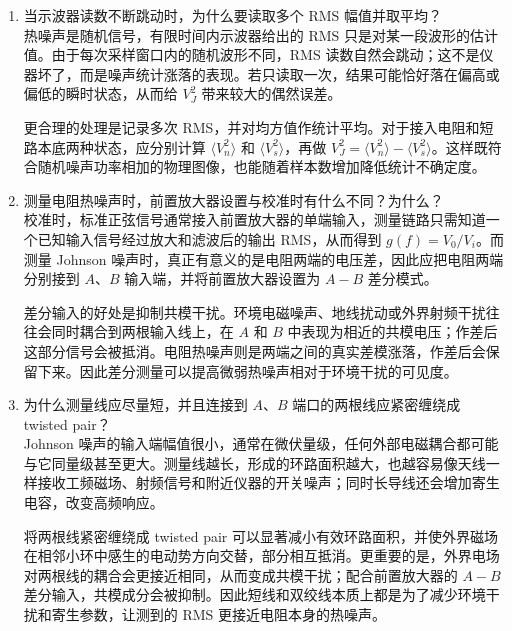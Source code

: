 \documentclass[11pt]{article}
\begin{document}
\begin{enumerate}
    需要注意的是，AC 耦合本身也会改变低频响应，相当于在测量链路中加入一个高通环节。因此 AC/DC 的选择没有绝对对错，关键仍是校准与噪声测量必须一致。本实验若校准时使用 AC，正式测量也必须使用 AC；否则 $g(f)$ 和实际噪声通过的频带不同，增益积分就失去意义。

    \item 当示波器读数不断跳动时，为什么要读取多个 RMS 幅值并取平均？\\
    热噪声是随机信号，有限时间内示波器给出的 RMS 只是对某一段波形的估计值。由于每次采样窗口内的随机波形不同，RMS 读数自然会跳动；这不是仪器坏了，而是噪声统计涨落的表现。若只读取一次，结果可能恰好落在偏高或偏低的瞬时状态，从而给 $V_J^2$ 带来较大的偶然误差。

    更合理的处理是记录多次 RMS，并对均方值作统计平均。对于接入电阻和短路本底两种状态，应分别计算 $\langle V_n^2\rangle$ 和 $\langle V_s^2\rangle$，再做 $V_J^2=\langle V_n^2\rangle-\langle V_s^2\rangle$。这样既符合随机噪声功率相加的物理图像，也能随着样本数增加降低统计不确定度。

    \item 测量电阻热噪声时，前置放大器设置与校准时有什么不同？为什么？\\
    校准时，标准正弦信号通常接入前置放大器的单端输入，测量链路只需知道一个已知输入信号经过放大和滤波后的输出 RMS，从而得到 $g(f)=V_0/V_i$。而测量 Johnson 噪声时，真正有意义的是电阻两端的电压差，因此应把电阻两端分别接到 $A$、$B$ 输入端，并将前置放大器设置为 $A-B$ 差分模式。

    差分输入的好处是抑制共模干扰。环境电磁噪声、地线扰动或外界射频干扰往往会同时耦合到两根输入线上，在 $A$ 和 $B$ 中表现为相近的共模电压；作差后这部分信号会被抵消。电阻热噪声则是两端之间的真实差模涨落，作差后会保留下来。因此差分测量可以提高微弱热噪声相对于环境干扰的可见度。

    \item 为什么测量线应尽量短，并且连接到 $A$、$B$ 端口的两根线应紧密缠绕成 twisted pair？\\
    Johnson 噪声的输入端幅值很小，通常在微伏量级，任何外部电磁耦合都可能与它同量级甚至更大。测量线越长，形成的环路面积越大，也越容易像天线一样接收工频磁场、射频信号和附近仪器的开关噪声；同时长导线还会增加寄生电容，改变高频响应。

    将两根线紧密缠绕成 twisted pair 可以显著减小有效环路面积，并使外界磁场在相邻小环中感生的电动势方向交替，部分相互抵消。更重要的是，外界电场对两根线的耦合会更接近相同，从而变成共模干扰；配合前置放大器的 $A-B$ 差分输入，共模成分会被抑制。因此短线和双绞线本质上都是为了减少环境干扰和寄生参数，让测到的 RMS 更接近电阻本身的热噪声。


\end{enumerate}
\end{document}
